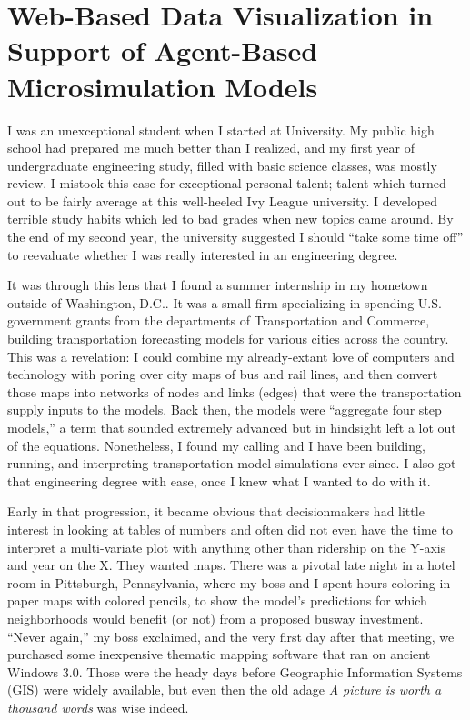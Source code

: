\hypertarget{introduction-main}{%
\section{Web-Based Data Visualization in Support of Agent-Based Microsimulation Models}
\label{introduction-main}}

I was an unexceptional student when I started at University. My public high school had prepared me much better than I realized, and my first year of undergraduate engineering study, filled with basic science classes, was mostly review. I mistook this ease for exceptional personal talent; talent which turned out to be fairly average at this well-heeled Ivy League university. I developed terrible study habits which led to bad grades when new topics came around. By the end of my second year, the university suggested I should ``take some time off'' to reevaluate whether I was really interested in an engineering degree.

It was through this lens that I found a summer internship in my hometown outside of Washington, D.C.. It was a small firm specializing in spending U.S. government grants from the departments of Transportation and Commerce, building transportation forecasting models for various cities across the country. This was a revelation: I could combine my already-extant love of computers and technology with poring over city maps of bus and rail lines, and then convert those maps into networks of nodes and links (edges) that were the transportation supply inputs to the models. Back then, the models were ``aggregate four step models,'' a term that sounded extremely advanced but in hindsight left a lot out of the equations. Nonetheless, I found my calling and I have been building, running, and interpreting transportation model simulations ever since. I also got that engineering degree with ease, once I knew what I wanted to do with it.

Early in that progression, it became obvious that decisionmakers had little interest in looking at tables of numbers and often did not even have the time to interpret a multi-variate plot with anything other than ridership on the Y-axis and year on the X. They wanted maps. There was a pivotal late night in a hotel room in Pittsburgh, Pennsylvania, where my boss and I spent hours coloring in paper maps with colored pencils, to show the model's predictions for which neighborhoods would benefit (or not) from a proposed busway investment. ``Never again,'' my boss exclaimed, and the very first day after that meeting, we purchased some inexpensive thematic mapping software that ran on ancient Windows 3.0. Those were the heady days before Geographic Information Systems (GIS) were widely available, but even then the old adage \emph{A picture is worth a thousand words} was wise indeed.

